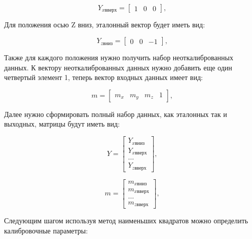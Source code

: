 \begin{equation}
    \label{eq:domain:Yxup}
    Y_{x вверх} = \begin{bmatrix}
            1 & 0 & 0
        \end{bmatrix}
        \text{,}
  \end{equation}

Для положения осью Z вниз, эталонный вектор будет иметь вид:

\begin{equation}
    \label{eq:domain:Yzdown}
    Y_{z вниз} = \begin{bmatrix}
            0 & 0 & -1
        \end{bmatrix}
        \text{,}
  \end{equation}

Также для каждого положения нужно получить набор неоткалиброванных данных. 
К вектору неоткалиброванных данных нужно добавить еще один четвертый элемент 1, теперь вектор входных данных имеет вид:

\begin{equation}
    \label{eq:domain:XL_meas}
    m = \begin{bmatrix}
            m_{x} & m_{y} & m_{z} & 1
        \end{bmatrix}
        \text{,}
  \end{equation}

Далее нужно сформировать полный набор данных, как эталонных так и выходных, матрицы будут иметь вид:

\begin{equation}
    \label{eq:domain:XL_Y_dataset}
    Y = \begin{bmatrix}
            Y_{x вниз} \\ Y_{x вверх} \\ \dots \\ Y_{z вверх}
        \end{bmatrix}
        \text{,}
  \end{equation}


\begin{equation}
    \label{eq:domain:XL_M_dataset}
    m = \begin{bmatrix}
            m_{x вниз} \\ m_{x вверх} \\ \dots \\ m_{z вверх}
        \end{bmatrix}
        \text{,}
  \end{equation}

Следующим шагом используя метод наименьших квадратов можно определить калибровочные параметры:

